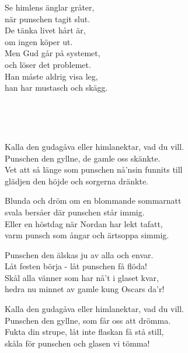 Se himlens änglar gråter,\\
när punschen tagit slut.\\
De tänka livet hårt är,\\
om ingen köper ut.\\
Men Gud går på systemet,\\
och löser det problemet.\\
Han måste aldrig visa leg,\\
han har mustasch och skägg.

\\

\newpage

 \\       

\songtext{}Kalla den gudagåva eller himlanektar, vad du vill.\\ 
Punschen den gyllne, de gamle oss skänkte.\\ 
Vet att så länge som punschen nå'nsin funnits till\\ 
glädjen den höjde och sorgerna dränkte.

Blunda och dröm om en blommande sommarnatt\\ 
svala bersåer där punschen står immig.\\ 
Eller en höstdag när Nordan har lekt tafatt,\\ 
varm punsch som ångar och ärtsoppa simmig.

Punschen den älskas ju av alla och envar.\\ 
Låt festen börja - låt punschen få flöda!\\ 
Skål alla vänner som har nå't i glaset kvar,\\ 
hedra nu minnet av gamle kung Oscars da'r!

Kalla den gudagåva eller himlanektar, vad du vill.\\ 
Punschen den gyllne, som får oss att drömma.\\ 
Fukta din strupe, låt inte flaskan få stå still,\\ 
skåla för punschen och glasen vi tömma!\\ 

\newpage


 \\       
\author{Text: André Mabande}

